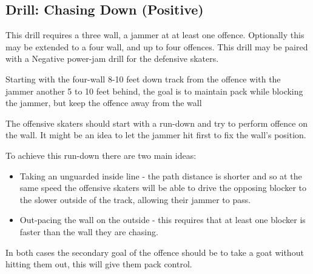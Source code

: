 \subsection*{Drill: Chasing Down (Positive)}
\label{drill:power_jam/chasing_down}

This drill requires a three wall, a jammer at at least one offence.
Optionally this may be extended to a four wall, and up to four offences.  
This drill may be paired with a Negative power-jam drill for the defensive skaters. 


Starting with the four-wall 8-10 feet down track from the offence with the jammer another 5 to 10 feet behind, the goal is to maintain pack while blocking the jammer, but keep the offence away from the wall


The offensive skaters should start with a run-down and try to perform offence on the wall. 
It might be an idea to let the jammer hit first to fix the wall's position.


To achieve this run-down there are two main ideas:
\begin{itemize}
\item Taking an unguarded inside line - the path distance is shorter and so at the same speed the offensive skaters will be able to drive the opposing blocker to the slower outside of the track, allowing their jammer to pass. 
\item Out-pacing the wall on the outside - this requires that at least one blocker is faster than the wall they are chasing.
\end{itemize}

In both cases the secondary goal of the offence should be to take a goat without hitting them out, this will give them pack control.



